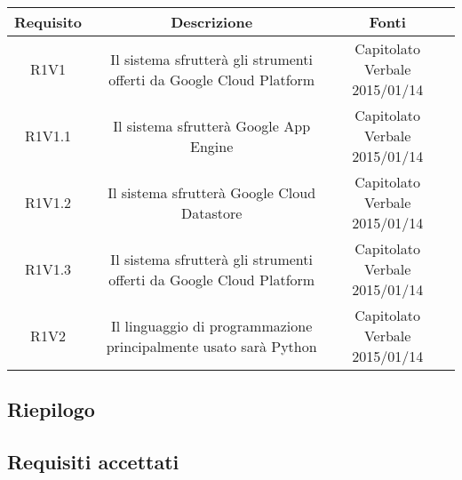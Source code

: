 \begin{center}
\begin{longtable}{|c|c|c|c|}
\hline

\textbf{Requisito} & \textbf{Descrizione} & \textbf{Fonti} \\
\hline

R1V1   & \parbox[t]{7cm}{Il sistema sfrutterà gli strumenti offerti da Google Cloud Platform}  & \parbox[t]{2cm}{ Capitolato \\ Verbale 2015/01/14 \\} \\
\hline
R1V1.1   & \parbox[t]{7cm}{Il sistema sfrutterà Google App Engine}  & \parbox[t]{2cm}{ Capitolato \\ Verbale 2015/01/14 \\} \\
\hline
R1V1.2   & \parbox[t]{7cm}{Il sistema sfrutterà Google Cloud Datastore}  & \parbox[t]{2cm}{ Capitolato \\ Verbale 2015/01/14 \\} \\
\hline
R1V1.3   & \parbox[t]{7cm}{Il sistema sfrutterà gli strumenti offerti da Google Cloud Platform}  & \parbox[t]{2cm}{ Capitolato \\ Verbale 2015/01/14 \\} \\
\hline
R1V2   & \parbox[t]{7cm}{Il linguaggio di programmazione principalmente usato sarà Python}  & \parbox[t]{2cm}{ Capitolato \\ Verbale 2015/01/14 \\} \\
\hline


\end{longtable}
\end{center}

\subsection{Riepilogo}

\subsection{Requisiti accettati}
